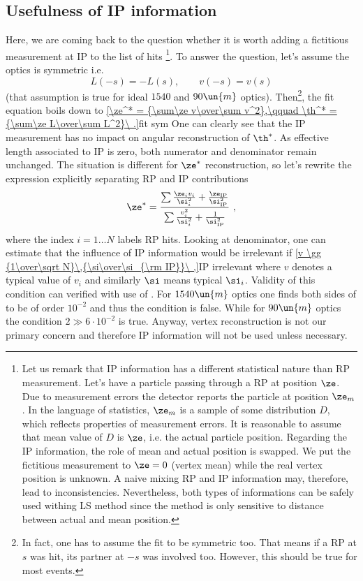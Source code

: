 \break
\subsection[ip]{Usefulness of IP information}

Here, we are coming back to the question whether it is worth adding a fictitious measurement at IP to the list of hits
\footnote{%
Let us remark that IP information has a different statistical nature than RP measurement. Let's have a particle passing through a RP at position $\ze$. Due to measurement errors the detector reports the particle at position $\ze_m$. In the language of statistics, $\ze_m$ is a sample of some distribution $D$, which reflects properties of measurement errors. It is reasonable to assume that mean value of $D$ is $\ze$, i.e. the actual particle position. Regarding the IP information, the role of mean and actual position is swapped. We put the fictitious measurement to $\ze = 0$ (vertex mean) while the real vertex position is unknown. A naive mixing RP and IP information may, therefore, lead to inconsistencies. Nevertheless, both types of informations can be safely used withing LS method since the method is only sensitive to distance between actual and mean position.
}. To answer the question, let's assume the optics is symmetric i.e.
$$L(-s) = - L(s),\qquad v(-s) = v(s)$$
(that assumption is true for ideal $1540$ and $90\un{m}$ optics). Then\footnote{%
In fact, one has to assume the fit to be symmetric too. That means if a RP at $s$ was hit, its partner at $-s$ was involved too. However, this should be true for most events.
}, the fit equation boils down to
\eqref{\ze^* = {\sum\ze v\over\sum v^2},\qquad \th^* = {\sum\ze L\over\sum L^2}\ .}{fit sym}
One can clearly see that the IP measurement has no impact on angular reconstruction of $\th^*$. As effective length associated to IP is zero, both numerator and denominator remain unchanged. The situation is different for $\ze^*$ reconstruction, so let's rewrite the expression explicitly separating RP and IP contributions
$$\ze^* = {\sum{\ze_i v_i\over\si_i^2} + {\ze_{\rm IP}\over \si^2_{\rm IP}}\over \sum {v_i^2\over\si_i^2} + {1\over\si_{\rm IP}^2}}\ ,$$
where the index $i = 1\ldots N$ labels RP hits. Looking at denominator, one can estimate that the influence of IP information would be irrelevant if
\eqref{v \gg {1\over\sqrt N}\,{\si\over\si_{\rm IP}}\ ,}{IP irrelevant}
where $v$ denotes a typical value of $v_i$ and similarly $\si$ means typical $\si_i$. Validity of this condition can verified with use of . For $1540\un{m}$ optics one finds both sides of  to be of order $10^{-2}$ and thus the condition is false. While for $90\un{m}$ optics the condition $2 \gg 6\cdot10^{-2}$ is true. Anyway, vertex reconstruction is not our primary concern and therefore IP information will not be used unless necessary.


